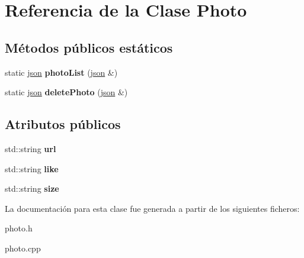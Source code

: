 \hypertarget{classPhoto}{}\section{Referencia de la Clase Photo}
\label{classPhoto}
\subsection*{Métodos públicos estáticos}
\begin{DoxyCompactItemize}
\item 
\mbox{\label{classPhoto_a55e30d720519129a01846f1c04a2b53b}} 
static \mbox{\hyperlink{classnlohmann_1_1basic__json}{json}} {\bfseries photo\+List} (\mbox{\hyperlink{classnlohmann_1_1basic__json}{json}} \&)
\item 
\mbox{\label{classPhoto_a89cbfa817ef4cb8d312a7ff1e319cfd5}} 
static \mbox{\hyperlink{classnlohmann_1_1basic__json}{json}} {\bfseries delete\+Photo} (\mbox{\hyperlink{classnlohmann_1_1basic__json}{json}} \&)
\end{DoxyCompactItemize}
\subsection*{Atributos públicos}
\begin{DoxyCompactItemize}
\item 
\mbox{\label{classPhoto_aeec996d78568b5591c920bee1477e727}} 
std\+::string {\bfseries url}
\item 
\mbox{\label{classPhoto_ac947859a8696a44a7d80a6f96d7f923a}} 
std\+::string {\bfseries like}
\item 
\mbox{\label{classPhoto_a4268d0d173e905cafe239bd5cd3bc668}} 
std\+::string {\bfseries size}
\end{DoxyCompactItemize}


La documentación para esta clase fue generada a partir de los siguientes ficheros\+:\begin{DoxyCompactItemize}
\item 
photo.\+h\item 
photo.\+cpp\end{DoxyCompactItemize}
